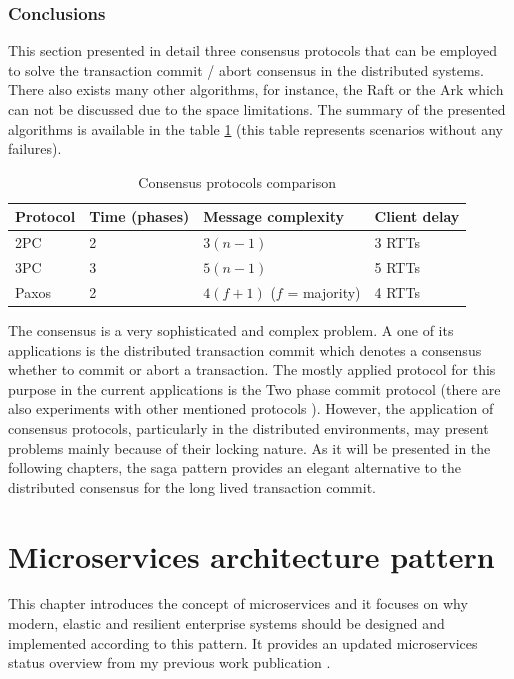 \documentclass[oneside,
  digital, %
  table,   %
  nolof,     %
  nolot,     %
]{fithesis3}
\begin{document}
\subsection{Conclusions}

This section presented in detail three consensus protocols that can be employed to solve the transaction commit / abort consensus in the distributed systems. There also exists many other algorithms, for instance, the Raft or the Ark which can not be discussed due to the space limitations. The summary of the presented algorithms is available in the table \ref{tab:consensus-protocols-comparison} (this table represents scenarios without any failures).

\begin{table}
    \begin{tabularx}{\textwidth}{lllX}
        \toprule
        Protocol & Time (phases) & Message complexity & Client delay \\
        \midrule
        2PC & 2 & $3(n - 1)$ & 3 RTTs \\
        3PC & 3 & $5(n - 1)$ & 5 RTTs \\
        Paxos & 2 & $4(f + 1)$ ($f$ = majority) & 4 RTTs \\
        \bottomrule
    \end{tabularx}
    \caption{Consensus protocols comparison}
    \label{tab:consensus-protocols-comparison}
\end{table}

The consensus is a very sophisticated and complex problem. A one of its applications is the distributed transaction commit which denotes a consensus whether to commit or abort a transaction. The mostly applied protocol for this purpose in the current applications is the Two phase commit protocol (there are also experiments with other mentioned protocols \cite{paxosTransCommit}). However, the application of consensus protocols, particularly in the distributed environments, may present problems mainly because of their locking nature. As it will be presented in the following chapters, the saga pattern \cite{sagas_publ} provides an elegant alternative to the distributed consensus for the long lived transaction commit.



\clearpage
\chapter{Microservices architecture pattern}

This chapter introduces the concept of microservices and it focuses on why modern, elastic and resilient enterprise systems should be designed and implemented according to this pattern. It provides an updated microservices status overview from my previous work publication \cite{bachelor_thesis}.
\end{document}
